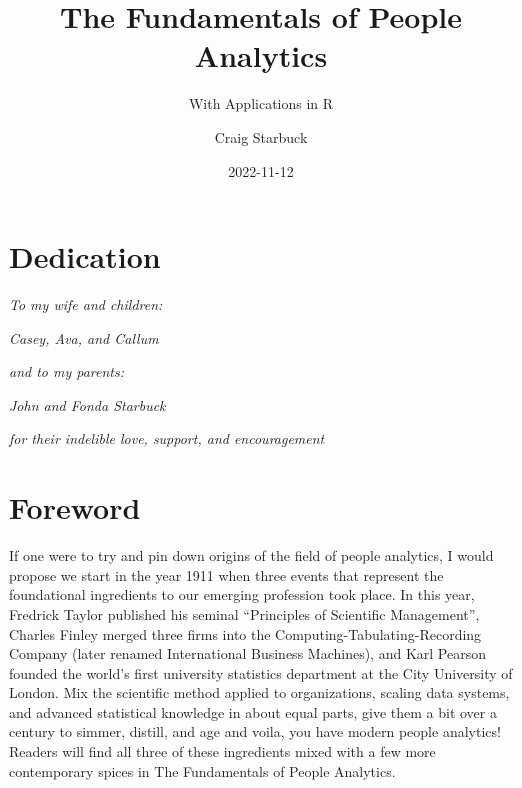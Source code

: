 \documentclass[
]{book}
\title{The Fundamentals of People Analytics}
\subtitle{With Applications in R}
\author{Craig Starbuck}
\date{2022-11-12}
\begin{document}
\maketitle

{
\setcounter{tocdepth}{1}
\tableofcontents
}
\hypertarget{dedication}{%
\chapter*{Dedication}\label{dedication}}

\emph{To my wife and children:}

\emph{Casey, Ava, and Callum}

\emph{and to my parents:}

\emph{John and Fonda Starbuck}

\emph{for their indelible love, support, and encouragement}

\hypertarget{foreword}{%
\chapter*{Foreword}\label{foreword}}

If one were to try and pin down origins of the field of people analytics, I would propose we start in the year 1911 when three events that represent the foundational ingredients to our emerging profession took place. In this year, Fredrick Taylor published his seminal ``Principles of Scientific Management'', Charles Finley merged three firms into the Computing-Tabulating-Recording Company (later renamed International Business Machines), and Karl Pearson founded the world's first university statistics department at the City University of London. Mix the scientific method applied to organizations, scaling data systems, and advanced statistical knowledge in about equal parts, give them a bit over a century to simmer, distill, and age and voila, you have modern people analytics! Readers will find all three of these ingredients mixed with a few more contemporary spices in The Fundamentals of People Analytics.
\end{document}
